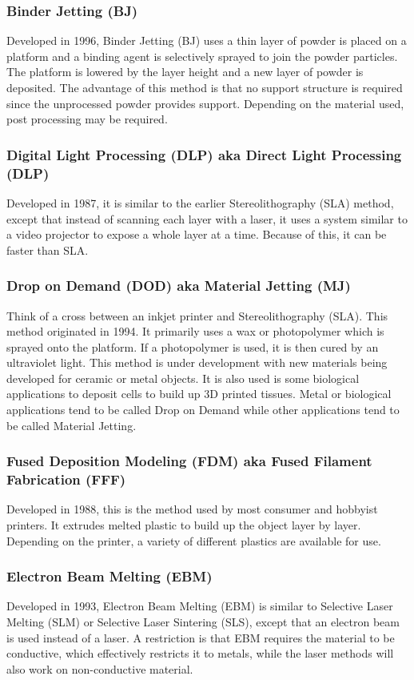 \documentclass[english,10pt]{beamer}
\begin{document}
\begin{frame}
  \frametitle{Binder Jetting (BJ)}
  Developed in 1996, Binder Jetting (BJ) uses a thin layer of powder is placed on a platform and a binding agent is selectively sprayed to join the powder particles.  The platform is lowered by the layer height and a new layer of powder is deposited.  The advantage of this method is that no support structure is required since the unprocessed powder provides support.  Depending on the material used, post processing may be required.
\end{frame}

\begin{frame}
  \frametitle{Digital Light Processing (DLP) aka Direct Light Processing (DLP)}
  Developed in 1987, it is similar to the earlier Stereolithography (SLA) method, except that instead of scanning each layer with a laser, it uses a system similar to a video projector to expose a whole layer at a time.  Because of this, it can be faster than SLA.
\end{frame}

\begin{frame}
  \frametitle{Drop on Demand (DOD) aka Material Jetting (MJ)}
  Think of a cross between an inkjet printer and Stereolithography (SLA).  This method originated in 1994.  It primarily uses a wax or photopolymer which is sprayed onto the platform.  If a photopolymer is used, it is then cured by an ultraviolet light.  This method is under development with new materials being developed for ceramic or metal objects.  It is also used is some biological applications to deposit cells to build up 3D printed tissues.  Metal or biological applications tend to be called Drop on Demand while other applications tend to be called Material Jetting.
\end{frame}

\begin{frame}
  \frametitle{Fused Deposition Modeling (FDM) aka Fused Filament Fabrication (FFF)}
  Developed in 1988, this is the method used by most consumer and hobbyist printers.  It extrudes melted plastic to build up the object layer by layer.  Depending on the printer, a variety of different plastics are available for use.
\end{frame}

\begin{frame}
  \frametitle{Electron Beam Melting (EBM)}
  Developed in 1993, Electron Beam Melting (EBM) is similar to Selective Laser Melting (SLM) or Selective Laser Sintering (SLS), except that an electron beam is used instead of a laser.  A restriction is that EBM requires the material to be conductive, which effectively restricts it to metals, while the laser methods will also work on non-conductive material.
\end{frame}
\end{document}
